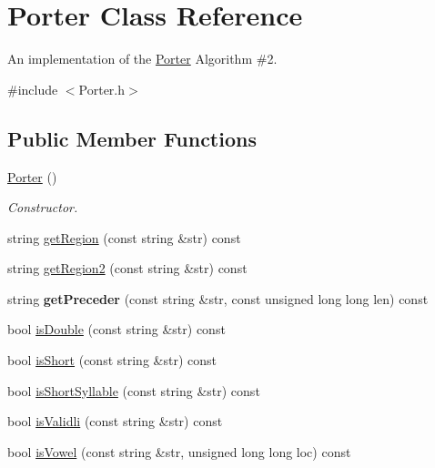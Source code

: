 \hypertarget{classPorter}{}\section{Porter Class Reference}
\label{classPorter}


An implementation of the \hyperlink{classPorter}{Porter} Algorithm \#2.  




{\ttfamily \#include $<$Porter.\+h$>$}

\subsection*{Public Member Functions}
\begin{DoxyCompactItemize}
\item 
\mbox{\label{classPorter_a04be3733ab5109a1cf6131de05cc5961}} 
\hyperlink{classPorter_a04be3733ab5109a1cf6131de05cc5961}{Porter} ()
\begin{DoxyCompactList}\small\item\em Constructor. \end{DoxyCompactList}\item 
string \hyperlink{classPorter_a9e33d06b477f04db7c8cee07e85e8bcb}{get\+Region} (const string \&str) const
\item 
string \hyperlink{classPorter_a1420c413bb564a22e4fc0c6627e1870b}{get\+Region2} (const string \&str) const
\item 
\mbox{\label{classPorter_a2000ce7eeabb3a7d9593fa9790a4fdc4}} 
string {\bfseries get\+Preceder} (const string \&str, const unsigned long long len) const
\item 
bool \hyperlink{classPorter_a7c8a4b3b6103ce655e8ffc8a3eba1897}{is\+Double} (const string \&str) const
\item 
bool \hyperlink{classPorter_a35b1cc5606d4e78d1f69ac4037fdde87}{is\+Short} (const string \&str) const
\item 
bool \hyperlink{classPorter_a36e6678f68a4cc29371cc0111a8c8860}{is\+Short\+Syllable} (const string \&str) const
\item 
bool \hyperlink{classPorter_ac53ad85d5d3178b72178a4d89137b55e}{is\+Validli} (const string \&str) const
\item 
bool \hyperlink{classPorter_ab16d2762c47b86b9a161be3d2c44203e}{is\+Vowel} (const string \&str, unsigned long long loc) const
\item 

\end{DoxyCompactItemize}
